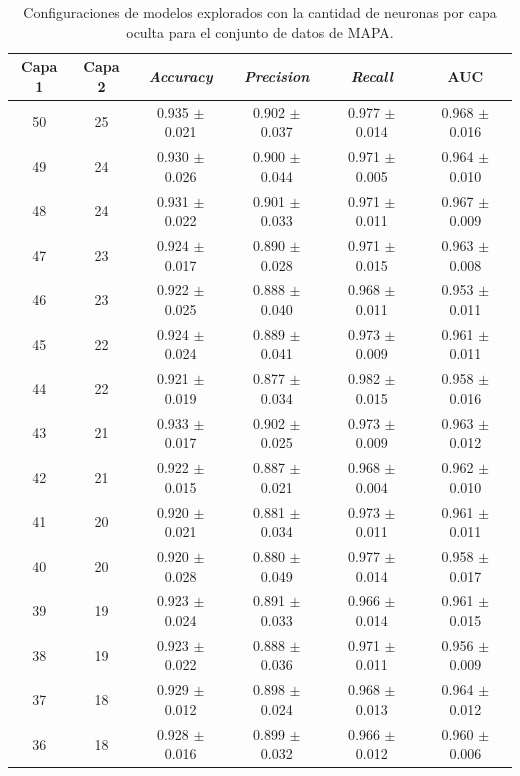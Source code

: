 \begin{table}[H]
	\centering
	\caption[Configuraciones de modelos explorados para el conjunto de datos de MAPA.]{Configuraciones de modelos explorados con la cantidad de neuronas por capa oculta para el conjunto de datos de MAPA.}
	\begin{tabular}{c c c c c c}    
		\toprule
		\textbf{Capa 1} & \textbf{Capa 2} & \textbf{\emph{Accuracy}} & \textbf{\emph{Precision}} & \textbf{\emph{Recall}}  & \textbf{AUC}\\
		\midrule
    
       50 & 25	& 0.935 $\pm$ 0.021 & 0.902  $\pm$ 0.037	& 0.977  $\pm$ 0.014 & 0.968  $\pm$ 0.016\\
       49 & 24 & 0.930 $\pm$ 0.026 & 0.900  $\pm$ 0.044 & 0.971  $\pm$ 0.005 & 0.964 $\pm$ 0.010\\
       48 & 24 & 0.931 $\pm$ 0.022 & 0.901 $\pm$ 0.033 & 0.971 $\pm$ 0.011 & 0.967 $\pm$ 0.009\\
       47 & 23 & 0.924 $\pm$ 0.017 & 0.890 $\pm$ 0.028 & 0.971 $\pm$ 0.015 & 0.963 $\pm$ 0.008\\
       46 & 23 & 0.922 $\pm$ 0.025 & 0.888 $\pm$ 0.040 & 0.968 $\pm$ 0.011 & 0.953 $\pm$ 0.011\\
       45 & 22 & 0.924 $\pm$ 0.024 & 0.889 $\pm$ 0.041 & 0.973 $\pm$ 0.009 & 0.961 $\pm$ 0.011\\ 
       44 & 22 & 0.921 $\pm$ 0.019 & 0.877 $\pm$ 0.034 & 0.982 $\pm$ 0.015 & 0.958 $\pm$ 0.016\\ 
       43 & 21 & 0.933 $\pm$ 0.017 & 0.902 $\pm$ 0.025 & 0.973 $\pm$ 0.009 & 0.963 $\pm$ 0.012\\ 
       42 & 21 & 0.922 $\pm$ 0.015 & 0.887 $\pm$ 0.021 & 0.968 $\pm$ 0.004 & 0.962 $\pm$ 0.010\\ 
       41 & 20 & 0.920 $\pm$ 0.021 & 0.881 $\pm$ 0.034 & 0.973 $\pm$ 0.011 & 0.961 $\pm$ 0.011\\ 
       40 & 20 & 0.920 $\pm$ 0.028 & 0.880 $\pm$ 0.049 & 0.977 $\pm$ 0.014 & 0.958 $\pm$ 0.017\\ 
       39 & 19 & 0.923 $\pm$ 0.024 & 0.891 $\pm$ 0.033 & 0.966 $\pm$ 0.014 & 0.961 $\pm$ 0.015\\ 
       38 & 19 & 0.923 $\pm$ 0.022 & 0.888 $\pm$ 0.036 & 0.971 $\pm$ 0.011 & 0.956 $\pm$ 0.009\\ 
       37 & 18 & 0.929 $\pm$ 0.012 & 0.898 $\pm$ 0.024 & 0.968 $\pm$ 0.013 & 0.964 $\pm$ 0.012\\ 
       36 & 18 & 0.928 $\pm$ 0.016 & 0.899 $\pm$ 0.032 & 0.966 $\pm$ 0.012 & 0.960 $\pm$ 0.006\\ 

\end{tabular}
\end{table}
